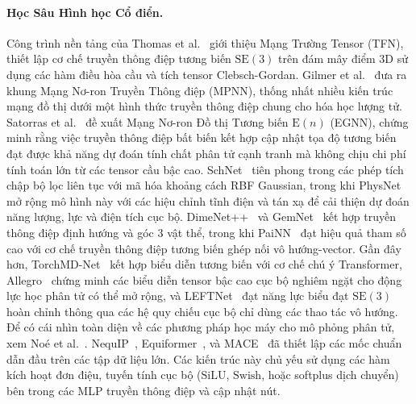 \documentclass[10pt,twocolumn,letterpaper]{article}
\begin{document}
\paragraph{Học Sâu Hình học Cổ điển.}
Công trình nền tảng của Thomas et al.~\cite{thomasTensorFieldNetworks2018} giới thiệu Mạng Trường Tensor (TFN), thiết lập cơ chế truyền thông điệp tương biến $\mathrm{SE}(3)$ trên đám mây điểm 3D sử dụng các hàm điều hòa cầu và tích tensor Clebsch-Gordan.
Gilmer et al.~\cite{gilmer2017neural} đưa ra khung Mạng Nơ-ron Truyền Thông điệp (MPNN), thống nhất nhiều kiến trúc mạng đồ thị dưới một hình thức truyền thông điệp chung cho hóa học lượng tử.
Satorras et al.~\cite{satorras2022enequivariantgraphneural} đề xuất Mạng Nơ-ron Đồ thị Tương biến $\mathrm{E}(n)$ (EGNN), chứng minh rằng việc truyền thông điệp bất biến kết hợp cập nhật tọa độ tương biến đạt được khả năng dự đoán tính chất phân tử cạnh tranh mà không chịu chi phí tính toán lớn từ các tensor cầu bậc cao.
SchNet~\cite{schütt2017schnetcontinuousfilterconvolutionalneural} tiên phong trong các phép tích chập bộ lọc liên tục với mã hóa khoảng cách RBF Gaussian, trong khi PhysNet~\cite{unkePhysNetNeuralNetwork2019} mở rộng mô hình này với các hiệu chỉnh tĩnh điện và tán xạ để cải thiện dự đoán năng lượng, lực và điện tích cục bộ.
DimeNet++~\cite{klicperaFastUncertaintyAwareDirectional2020} và GemNet~\cite{klicperaGemNetUniversalDirectional2021} kết hợp truyền thông điệp định hướng và góc 3 vật thể, trong khi PaiNN~\cite{schuttEquivariantMessagePassing2021} đạt hiệu quả tham số cao với cơ chế truyền thông điệp tương biến ghép nối vô hướng-vector.
Gần đây hơn, TorchMD-Net~\cite{tholke2022torchmdnet} kết hợp biểu diễn tương biến với cơ chế chú ý Transformer, Allegro~\cite{musaelianLearningLocalEquivariant2022} chứng minh các biểu diễn tensor bậc cao cục bộ nghiêm ngặt cho động lực học phân tử có thể mở rộng, và LEFTNet~\cite{duNewPerspectiveBuilding2023} đạt năng lực biểu đạt $\mathrm{SE}(3)$ hoàn chỉnh thông qua các hệ quy chiếu cục bộ chỉ dùng các thao tác vô hướng. Để có cái nhìn toàn diện về các phương pháp học máy cho mô phỏng phân tử, xem No{\'e} et al.~\cite{Noe:2019yup}.
NequIP~\cite{batznerE3equivariantGraphNeural2021}, Equiformer~\cite{liao2023equiformer}, và MACE~\cite{batatiaMACEHigherOrder2022} đã thiết lập các mốc chuẩn dẫn đầu trên các tập dữ liệu lớn.
Các kiến trúc này chủ yếu sử dụng các hàm kích hoạt đơn điệu, tuyến tính cục bộ ($\text{SiLU}$, $\text{Swish}$, hoặc softplus dịch chuyển) bên trong các MLP truyền thông điệp và cập nhật nút.
\end{document}
